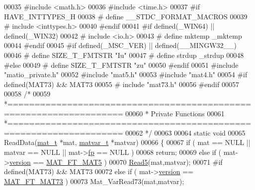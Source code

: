 \begin{DoxyCode}
00035 \textcolor{preprocessor}{#include <math.h>}
00036 \textcolor{preprocessor}{#include <time.h>}
00037 \textcolor{preprocessor}{#if HAVE\_INTTYPES\_H}
00038 \textcolor{preprocessor}{#   define \_\_STDC\_FORMAT\_MACROS}
00039 \textcolor{preprocessor}{#   include <inttypes.h>}
00040 \textcolor{preprocessor}{#endif}
00041 \textcolor{preprocessor}{#if defined(\_WIN64) || defined(\_WIN32)}
00042 \textcolor{preprocessor}{#   include <io.h>}
00043 \textcolor{preprocessor}{#   define mktemp \_mktemp}
00044 \textcolor{preprocessor}{#endif}
00045 \textcolor{preprocessor}{#if defined(\_MSC\_VER) || defined(\_\_MINGW32\_\_)}
00046 \textcolor{preprocessor}{#   define SIZE\_T\_FMTSTR "Iu"}
00047 \textcolor{preprocessor}{#   define strdup \_strdup}
00048 \textcolor{preprocessor}{#else}
00049 \textcolor{preprocessor}{#   define SIZE\_T\_FMTSTR "zu"}
00050 \textcolor{preprocessor}{#endif}
00051 \textcolor{preprocessor}{#include "matio\_private.h"}
00052 \textcolor{preprocessor}{#include "mat5.h"}
00053 \textcolor{preprocessor}{#include "mat4.h"}
00054 \textcolor{preprocessor}{#if defined(MAT73) && MAT73}
00055 \textcolor{preprocessor}{#   include "mat73.h"}
00056 \textcolor{preprocessor}{#endif}
00057 
00058 \textcolor{comment}{/*}
00059 \textcolor{comment}{ *===================================================================}
00060 \textcolor{comment}{ *                 Private Functions}
00061 \textcolor{comment}{ *===================================================================}
00062 \textcolor{comment}{ */}
00063 
00064 \textcolor{keyword}{static} \textcolor{keywordtype}{void}
00065 ReadData(\hyperlink{struct__mat__t}{mat\_t} *mat, \hyperlink{group___m_a_t_structmatvar__t}{matvar\_t} *matvar)
00066 \{
00067     \textcolor{keywordflow}{if} ( mat == NULL || matvar == NULL || mat->\hyperlink{struct__mat__t_a85f562e407ca9ad4d2a6e14f839432b7}{fp} == NULL )
00068         \textcolor{keywordflow}{return};
00069     \textcolor{keywordflow}{else} \textcolor{keywordflow}{if} ( mat->\hyperlink{struct__mat__t_a729c2bc0afc97485057a5af425635b1a}{version} == \hyperlink{group___m_a_t_ggad03442b8378999189d510e3745c702b7a31ade1f6989411dc0299007e2c7d33b2}{MAT\_FT\_MAT5} )
00070         \hyperlink{mat5_8c_abd8669832a02e759fe190bf2724f60ae}{Read5}(mat,matvar);
00071 \textcolor{preprocessor}{#if defined(MAT73) && MAT73}
00072     \textcolor{keywordflow}{else} \textcolor{keywordflow}{if} ( mat->\hyperlink{struct__mat__t_a729c2bc0afc97485057a5af425635b1a}{version} == \hyperlink{group___m_a_t_ggad03442b8378999189d510e3745c702b7a765c5d1d5038947646260dc82483517e}{MAT\_FT\_MAT73} )
00073         Mat\_VarRead73(mat,matvar);

\end{DoxyCode}
